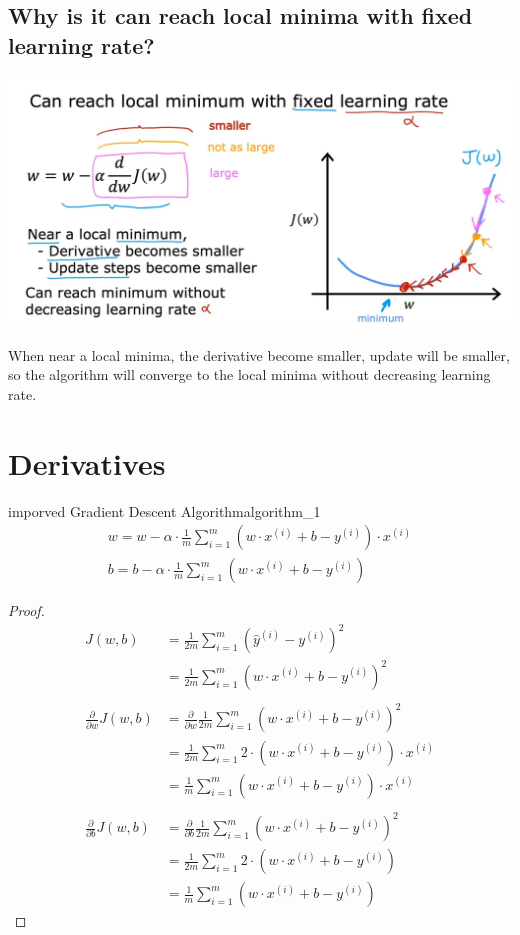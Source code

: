 \subsection*{Why is it can reach local minima with fixed learning rate?}
\noindent
\includegraphics[width=\textwidth]{images/2.3_4}
\begin{notebox}
When near a local minima, %
the derivative become smaller, %
update will be smaller, %
so the algorithm will converge to the local minima %
without decreasing learning rate.
\end{notebox}

\section{Derivatives}
\begin{thmbox}{imporved Gradient Descent Algorithm}{algorithm_1}
\begin{align}
    w = w - \alpha \cdot \frac{1}{m} \sum_{i=1}^{m} (w \cdot x^{(i)} + b - y^{(i)}) \cdot x^{(i)} \\
    b = b - \alpha \cdot \frac{1}{m} \sum_{i=1}^{m} (w \cdot x^{(i)} + b - y^{(i)})
\end{align}
\tcblower
\begin{proof}
    \begin{align*}
        J(w, b)
        &= \frac{1}{2m} \sum_{i=1}^{m} (\hat{y}^{(i)} - y^{(i)})^2\\
        &= \frac{1}{2m} \sum_{i=1}^{m} (w \cdot x^{(i)} + b - y^{(i)})^2\\
        \\
        \frac{\partial}{\partial w} J(w, b)
        &= \frac{\partial}{\partial w} \frac{1}{2m} \sum_{i=1}^{m} (w \cdot x^{(i)} + b - y^{(i)})^2 \\
        &= \frac{1}{2m} \sum_{i=1}^{m} 2 \cdot (w \cdot x^{(i)} + b - y^{(i)}) \cdot x^{(i)} \\
        &= \frac{1}{m} \sum_{i=1}^{m} (w \cdot x^{(i)} + b - y^{(i)}) \cdot x^{(i)} \\
        \\
        \frac{\partial}{\partial b} J(w, b)
        &= \frac{\partial}{\partial b} \frac{1}{2m} \sum_{i=1}^{m} (w \cdot x^{(i)} + b - y^{(i)})^2 \\
        &= \frac{1}{2m} \sum_{i=1}^{m} 2 \cdot (w \cdot x^{(i)} + b - y^{(i)}) \\
        &= \frac{1}{m} \sum_{i=1}^{m} (w \cdot x^{(i)} + b - y^{(i)})
    \end{align*}
\end{proof}
\end{thmbox}


